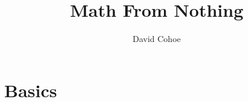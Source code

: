 \documentclass[12pt]{memoir}
\author{David Cohoe}
\title{Math From Nothing}
\date{}
\begin{document}
\maketitle

\tableofcontents



\part{Basics}














\end{document}
